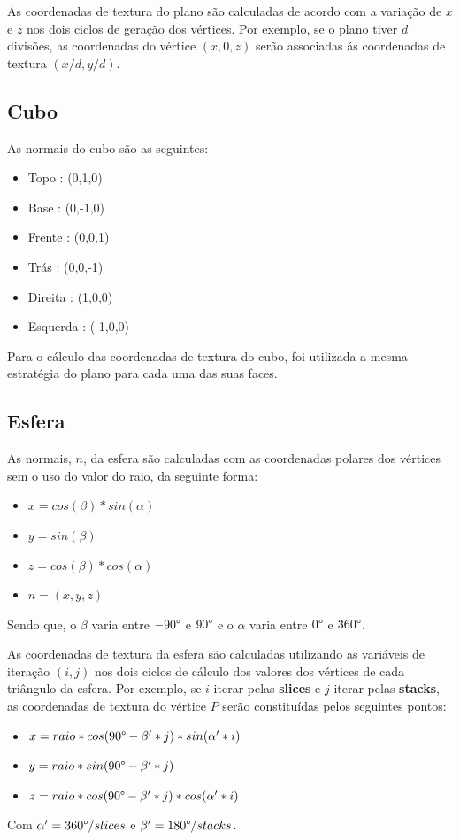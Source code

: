 \documentclass[11pt,a4paper]{report}
\begin{document}
As coordenadas de textura do plano são calculadas de acordo com a variação de $x$ e $z$ nos dois ciclos de geração dos vértices. Por exemplo, se o plano tiver $d$ divisões, as coordenadas do vértice $(x,0,z)$ serão associadas ás coordenadas de textura $(x/d ,y/d)$.

\subsection{Cubo}
As normais do cubo são as seguintes:
\begin{itemize}
    \item Topo : (0,1,0)
    \item Base : (0,-1,0)
    \item Frente : (0,0,1)
    \item Trás : (0,0,-1)
    \item Direita : (1,0,0)
    \item Esquerda : (-1,0,0)
\end{itemize}

Para o cálculo das coordenadas de textura do cubo, foi utilizada a mesma estratégia do plano para cada uma das suas faces.

\subsection{Esfera}
As normais, $n$, da esfera são calculadas com as coordenadas polares dos vértices sem o uso do valor do raio, da seguinte forma:
\begin{itemize}
    \item $x = cos(\beta)*sin(\alpha)$
    \item $y = sin(\beta)$
    \item $z = cos(\beta)*cos(\alpha)$
    \item $n = (x, y, z)$ 
\end{itemize}

Sendo que, o $\beta$ varia entre $-90 \text{\textdegree} $ e $90 \text{\textdegree}$ e o $\alpha$ varia entre $0 \text{\textdegree}$ e $360 \text{\textdegree}$.

As coordenadas de textura da esfera são calculadas utilizando as variáveis de iteração $(i, j)$ nos dois ciclos de cálculo dos valores dos vértices de cada triângulo da esfera. Por exemplo, se $i$ iterar pelas \textbf{slices} e $j$ iterar pelas \textbf{stacks}, as coordenadas de textura do vértice $P$ serão constituídas pelos seguintes pontos:
\begin{itemize}
    \item $x = raio*cos(90 \text{\textdegree} - \beta'*j)*sin(\alpha'*i)$
    \item $y = raio*sin(90 \text{\textdegree} - \beta'*j)$
    \item $z = raio*cos(90 \text{\textdegree} - \beta'*j)*cos(\alpha'*i)$
\end{itemize}
Com $\alpha' =  360 \text{\textdegree}/slices$ e $\beta' =  180 \text{\textdegree}/stacks$.
\end{document}
